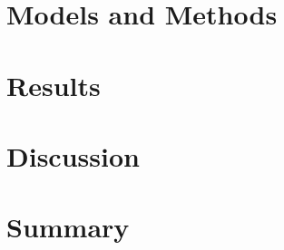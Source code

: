 \documentclass[a4paper,conference]{IEEEtran}
\begin{document}
\newpage
\begin{multicols}{2}


\section{Models and Methods}

\section{Results}

\section{Discussion}

\section{Summary}

\end{multicols}



\end{document}
